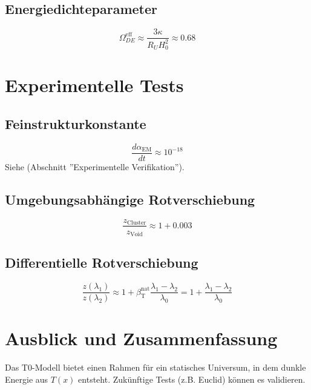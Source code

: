 \documentclass[a4paper,12pt]{article}
\theoremstyle{definition}
\theoremstyle{remark}
\newcommand{\Tfield}{T(x)}
\newcommand{\betaT}{\beta_{\text{T}}}
\begin{document}
	\subsection{Energiedichteparameter}
	
	\begin{equation}
		\Omega_{DE}^{\text{eff}} \approx \frac{3 \kappa}{R_U H_0^2} \approx 0.68
	\end{equation}
	
	\section{Experimentelle Tests}
	
	\subsection{Feinstrukturkonstante}
	
	\begin{equation}
		\frac{d \alpha_{\text{EM}}}{d t} \approx 10^{-18}
	\end{equation}
	Siehe \cite{pascher_photons_2025} (Abschnitt ''Experimentelle Verifikation'').
	
	\subsection{Umgebungsabhängige Rotverschiebung}
	
	\begin{equation}
		\frac{z_{\text{Cluster}}}{z_{\text{Void}}} \approx 1 + 0.003
	\end{equation}
	
	\subsection{Differentielle Rotverschiebung}
	
	\begin{equation}
		\frac{z(\lambda_1)}{z(\lambda_2)} \approx 1 + \betaT^{\text{nat}} \frac{\lambda_1 - \lambda_2}{\lambda_0} = 1 + \frac{\lambda_1 - \lambda_2}{\lambda_0}
	\end{equation}
	
	\section{Ausblick und Zusammenfassung}
	
	Das T0-Modell bietet einen Rahmen für ein statisches Universum, in dem dunkle Energie aus \(\Tfield\) entsteht. Zukünftige Tests (z.B. Euclid) können es validieren.
	
\end{document}
